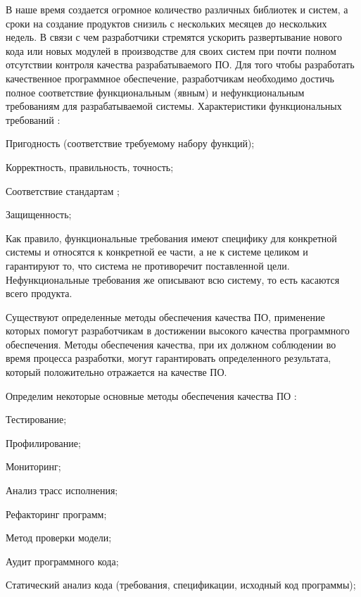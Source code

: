 \intro

В наше время создается огромное количество различных библиотек и систем, а сроки на создание продуктов снизиль с нескольких месяцев до нескольких недель.
В связи с чем разработчики стремятся ускорить развертывание нового кода или новых модулей в производстве для своих систем при почти полном отсутствии контроля качества разрабатываемого ПО.
Для того чтобы разработать качественное программное обеспечение, разработчикам необходимо достичь полное соответствие функциональным (явным) и нефункциональным требованиям для разрабатываемой системы.
Характеристики функциональных требований \cite{kursMAOK_1}:
%
\begin{itemize*}
\item Пригодность (соответствие требуемому набору функций);
\item Корректность, правильность, точность;
\item Соответствие стандартам ;
\item Защищенность;
\end{itemize*}
%

Как правило, функциональные требования имеют специфику для конкретной системы и относятся к конкретной ее части, а не к системе целиком и гарантируют то, что система не противоречит поставленной цели.
Нефункциональные требования же описывают всю систему, то есть касаются всего продукта.

Существуют определенные методы обеспечения качества ПО, применение которых помогут разработчикам в достижении высокого качества программного обеспечения.
Методы обеспечения качества, при их должном соблюдении во время процесса разработки, могут гарантировать определенного результата, который положительно отражается на качестве ПО.

Определим некоторые основные методы обеспечения качества ПО \cite{PI_book}:
%
\begin{itemize*}
\item Тестирование;
\item Профилирование;
\item Мониторинг;
\item Анализ трасс исполнения;
\item Рефакторинг программ;
\item Метод проверки модели;
\item Аудит программного кода;
\item Статический анализ кода (требования, спецификации, исходный код программы);
\end{itemize*}


